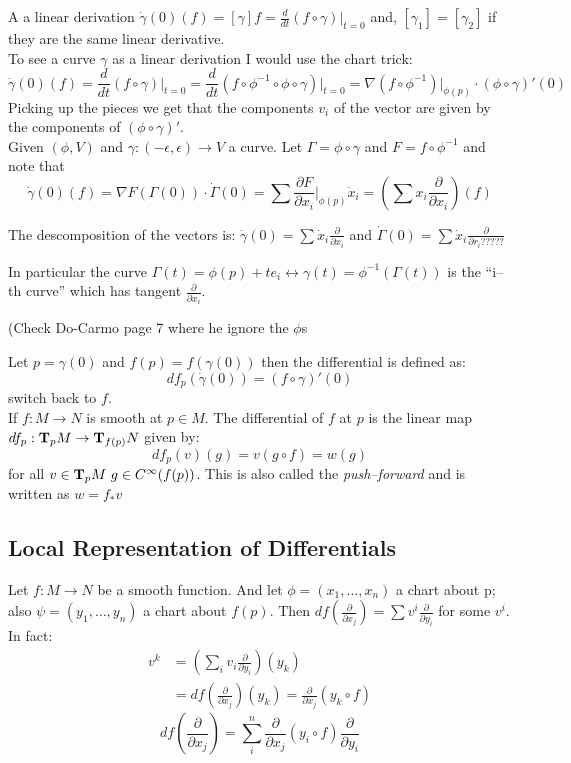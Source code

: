 A a linear derivation $\dot \gamma(0)(f)=[\gamma]f= \frac{d}{dt}(f\circ \gamma)\big|_{t=0}$ and, $[\gamma_1]=[\gamma_2] $ if they are the same linear derivative.\\
To see a curve $\gamma $ as a linear derivation I would use the chart trick: $$\dot\gamma(0)(f)=\frac{d}{dt}(f\circ \gamma)\big|_{t=0}=\frac{d}{dt}(f\circ \phi^{-1} \circ \phi\circ \gamma)\big|_{t=0}=\nabla (f\circ \phi^{-1})\big|_{\phi(p)} \cdot (\phi\circ \gamma)'(0)$$
Picking up the pieces we get that the components $v_i$ of the vector are given by the components of $(\phi\circ\gamma)'$.\\

Given $(\phi,V)$ and $\gamma:(-\epsilon ,\epsilon)\to V$ a curve. Let $\Gamma=\phi\circ\gamma$ and $F=f\circ \phi^{-1} $ and note that $$\dot\gamma(0)(f)=\nabla F(\Gamma(0))\cdot \dot \Gamma(0) = \sum \frac{\partial F }{\partial x_i}\bigg|_{\phi(p)} \dot x_i = \left(\sum x_i \frac{\partial}{\partial x_i}\right)(f) $$ 

The descomposition of the vectors is: $\dot \gamma(0)= \sum \dot x_i \frac{\partial}{\partial x_i} $ and $\dot \Gamma(0) = \sum \dot x_i \frac{\partial}{\partial r_i?????} $
 
In particular the  curve $\Gamma(t)=\phi(p)+ te_i\leftrightarrow \gamma(t)=\phi^{-1} (\Gamma(t))$ is the ``i--th curve'' which has tangent $\frac{\partial}{\partial x_i} $.

(Check Do-Carmo page 7 where he ignore the $\phi$s\\

\begin{ddef}[Differentials]
Let $p=\gamma(0)$ and $f(p)=f(\gamma(0))$ then the differential is defined as:
$$df_p(\dot\gamma(0))=(f\circ\gamma)'(0)$$
switch back to $f$.\\
If $f:M\to N$ is smooth at $p\in M$. The differential of $f$ at $p$ is the linear map $df_p:\text{\textbf{T}}_pM\to \text{\textbf{T}}_{f(p)}N$ given by:
$$df_p(v)(g)=v(g\circ f)=w(g)$$
for all $v\in \text{\textbf{T}}_pM\ g\in C^\infty(f(p))$. This is also called the \emph{push--forward} and is written as $w=f_*v$ 
\end{ddef}
\subsection{Local Representation of Differentials}
Let $f:M\to N$ be a smooth function. And let $\phi=(x_1,\ldots, x_n) $ a chart about p; also $\psi=(y_1,\ldots,y_n)$ a chart about $f(p)$. Then $df(\frac{\partial}{\partial x_j}) = \sum v^i \frac{\partial}{\partial y_i}$ for some $v^i$. In fact: 
\begin{align}
v^k &= \left(\sum_i v_i \frac{\partial}{\partial y_i}\right)(y_k)\\
    &= df\left(\frac{\partial}{\partial x_j}\right)(y_k)=\frac{\partial}{\partial x_j}(y_k\circ f)
\end{align}       
$$df\left(\frac{\partial}{\partial x_j}\right)=\sum_i^n \frac{\partial}{\partial x_j}(y_i\circ f) \frac{\partial}{\partial y_i}   $$

